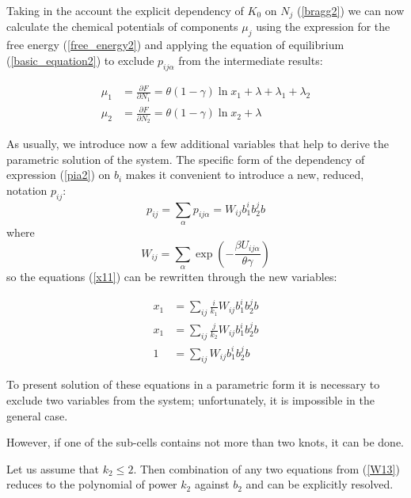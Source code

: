 \documentclass[12pt,abstract]{scrartcl}
\begin{document}
Taking in the account the explicit dependency of $K_0$ on $N_j$ (\ref{bragg2}) we can now calculate the chemical potentials of components $\mu_j$ using the expression for the free energy (\ref{free_energy2}) and applying the equation of equilibrium (\ref{basic_equation2}) to exclude $p_{i j \alpha}$ from the intermediate results:

\begin{equation} \label{mu1}
\begin{split}
    \mu_1 &= \frac{\partial F}{\partial N_1} =  \theta (1 - \gamma) \ln x_1  + \lambda  + \lambda_1 + \lambda_2\\
    \mu_2 &= \frac{\partial F}{\partial N_2} =  \theta (1 - \gamma) \ln x_2  + \lambda 
\end{split}
\end{equation}

As usually, we introduce now a few additional variables that  help to derive the parametric solution of the system.
The specific form of the dependency of expression (\ref{pia2}) on $b_i$ makes it convenient to introduce a new, reduced, notation $p_{i j}$:
\begin{equation} \label{pi}
    p_{i j} = \sum_\alpha p_{i j \alpha} = W_{i j} b_1^i b_2^j b
\end{equation}
where
\begin{equation} \label{Wi}
    W_{i j} = \sum_\alpha \exp \left(- {\frac{\beta U_{i j \alpha}}{\theta\gamma }}\right)
\end{equation}
so the equations (\ref{x11})  can be rewritten through the new variables:

\begin{equation} \label{W13}
\begin{split}
x_1 &= \sum_{i j } \frac{i}{k_1} W_{i j }  b_1^i b_2^j b\\
x_1& = \sum_{i j } \frac{j}{k_2} W_{i j }  b_1^i b_2^j b\\
1 &= \sum_{i j } W_{i j }  b_1^i b_2^j b
\end{split}
\end{equation}

To present solution of these equations in a parametric form it is necessary to exclude two variables from the system; unfortunately, it is impossible in the general case. 

However, if one of the sub-cells contains not more than two knots, it can be done.

Let us assume that $k_2 \leq 2$. 
Then combination of any two equations from (\ref{W13}) reduces to the polynomial of power $k_2$ against $b_2$ and can be explicitly resolved.
\end{document}
